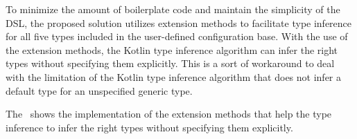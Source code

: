 To minimize the amount of boilerplate code and maintain the simplicity of the DSL, the proposed solution utilizes extension methods to
facilitate type inference for all five types included in the user-defined configuration base.
With the use of the extension methods, the Kotlin type inference algorithm can infer the right types without specifying them explicitly.
This is a sort of workaround to deal with the limitation of the Kotlin type inference algorithm that does not infer a default type for an
unspecified generic type.



The~ shows the implementation of the extension methods that help the type inference to infer the
right types without specifying them explicitly.


